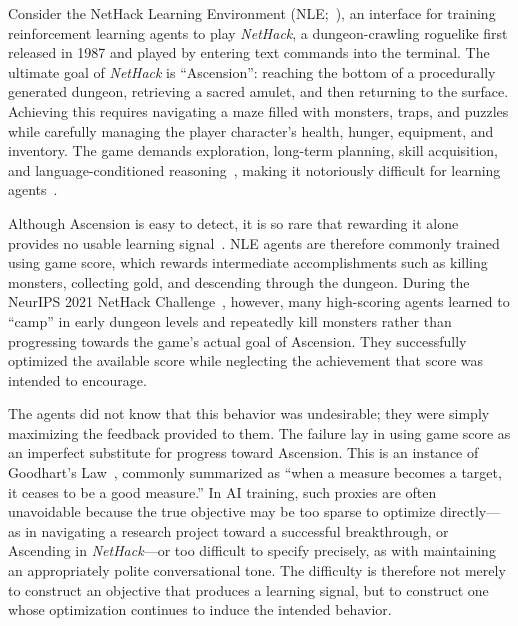 \documentclass[10pt]{article}
\def\citep#1{}%
\def\citealp#1{}%
\begin{document}
Consider the NetHack Learning Environment (NLE;~\citealp{kuttler2020nethacklearningenvironment}), an interface for training reinforcement learning agents to play \textit{NetHack}, a dungeon-crawling roguelike first released in 1987 and played by entering text commands into the terminal.
The ultimate goal of \textit{NetHack} is ``Ascension'': reaching the bottom of a procedurally generated dungeon, retrieving a sacred amulet, and then returning to the surface.
Achieving this requires navigating a maze filled with monsters, traps, and puzzles while carefully managing the player character's health, hunger, equipment, and inventory.
The game demands exploration, long-term planning, skill acquisition, and language-conditioned reasoning~\citep{zhang2020beboldexplorationboundaryexplored, zhong2022silgmultienvironmentsymbolicinteractive, hambro2022insightsneurips2021nethack}, making it notoriously difficult for learning agents~\citep{hambro2022insightsneurips2021nethack}.

Although Ascension is easy to detect, it is so rare that rewarding it alone provides no usable learning signal~\citep{kuttler2020nethacklearningenvironment}.
NLE agents are therefore commonly trained using game score, which rewards intermediate accomplishments such as killing monsters, collecting gold, and descending through the dungeon.
During the NeurIPS 2021 NetHack Challenge~\citep{hambro2022insightsneurips2021nethack}, however, many high-scoring agents learned to ``camp'' in early dungeon levels and repeatedly kill monsters rather than progressing towards the game's actual goal of Ascension.
They successfully optimized the available score while neglecting the achievement that score was intended to encourage.

The agents did not know that this behavior was undesirable; they were simply maximizing the feedback provided to them.
The failure lay in using game score as an imperfect substitute for progress toward Ascension.
This is an instance of Goodhart's Law~\citep{goodhart1984problems}, commonly summarized as ``when a measure becomes a target, it ceases to be a good measure.''
In AI training, such proxies are often unavoidable because the true objective may be too sparse to optimize directly---as in navigating a research project toward a successful breakthrough, or Ascending in \textit{NetHack}---or too difficult to specify precisely, as with maintaining an appropriately polite conversational tone.
The difficulty is therefore not merely to construct an objective that produces a learning signal, but to construct one whose optimization continues to induce the intended behavior.
\end{document}
